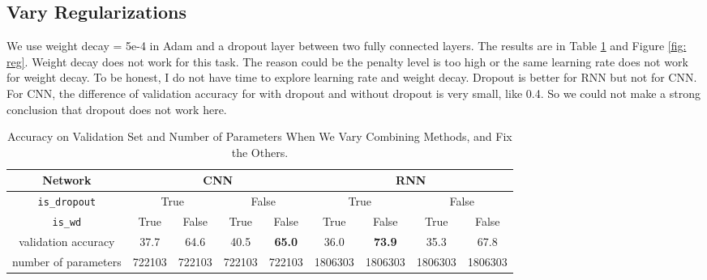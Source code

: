 \documentclass[10pt,a4paper]{article}
\begin{document}
\subsection{Vary Regularizations}
We use weight decay = 5e-4 in Adam and a dropout layer between two fully connected layers. The results are in Table \ref{tab: reg} and Figure \ref{fig: reg}. Weight decay does not work for this task. The reason could be the penalty level is too high or the same learning rate does not work for weight decay. To be honest, I do not have time to explore learning rate and weight decay. Dropout is better for RNN but not for CNN. For CNN, the difference of validation accuracy for with dropout and without dropout is very small, like 0.4. So we could not make a strong conclusion that dropout does not work here.
\begin{table}[!ht]
\centering
\begin{tabular}{|c|c|c|c|c|c|c|c|c|}
\hline
Network & \multicolumn{4}{|c|}{CNN} & \multicolumn{4}{|c|}{RNN} \\ \hline
\texttt{is\_dropout} & \multicolumn{2}{|c|}{True}& \multicolumn{2}{|c|}{False}& \multicolumn{2}{|c|}{True} & \multicolumn{2}{|c|}{False}\\ \hline
\texttt{is\_wd} & True& False & True& False & True& False& True& False\\ \hline
validation accuracy & 37.7 &  64.6 & 40.5 & \textbf{65.0} & 36.0 & \textbf{73.9} & 35.3 & 67.8\\ \hline
number of parameters & 722103 & 722103 & 722103 &722103 & 1806303 & 1806303 & 1806303&1806303\\ \hline
\end{tabular}
\caption{\label{tab: reg}Accuracy on Validation Set and Number of Parameters When We Vary Combining Methods, and Fix the Others.}
\end{table}
\end{document}
